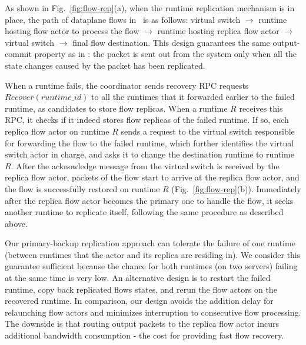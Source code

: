 As shown in Fig.~\ref{fig:flow-rep}(a), when the runtime replication mechanism is in place, the path of dataplane flows in \nfactor~is as follows: virtual switch $\rightarrow$ runtime hosting flow actor to process the flow $\rightarrow$ runtime hosting replica flow actor $\rightarrow$ virtual switch $\rightarrow$ final flow destination. This design guarantees the same output-commit property as in \cite{sherry2015rollback}: the packet is sent out from the system only when all the state changes caused by the packet has been replicated. %



When a runtime fails, the coordinator sends recovery RPC requests $Recover(runtime\_id) $ to all the runtimes that it forwarded earlier to the failed runtime, as candidates to store flow replicas. When a runtime $R$ receives this RPC, it checks if it indeed stores flow replicas of the failed runtime. If so, each replica flow actor on runtime $R$ sends a request to the virtual switch responsible for forwarding the flow to the failed runtime, which further identifies the virtual switch actor in charge, and asks it to change the destination runtime to runtime $R$. After the acknowledge message from the virtual switch is received by the replica flow actor, packets of the flow start to arrive at the replica flow actor, and the flow is successfully restored on runtime $R$ (Fig.~\ref{fig:flow-rep}(b)). Immediately after the replica flow actor becomes the primary one to handle the flow, it seeks another runtime to replicate itself, following the same procedure as described above.


Our primary-backup replication approach can tolerate the failure of one runtime (between runtimes that the actor and its replica are residing in). We consider this guarantee sufficient because the
chance for both runtimes (on two servers) failing at the same time is very low. An alternative design is to restart the failed runtime, copy back replicated flows states, and rerun the flow actors on the recovered runtime. In comparison, our design avoids the addition delay for relaunching flow actors and minimizes interruption to consecutive flow processing. %
 The downside is that routing output packets to the replica flow actor incurs additional bandwidth consumption -  the cost for providing fast flow recovery. %


